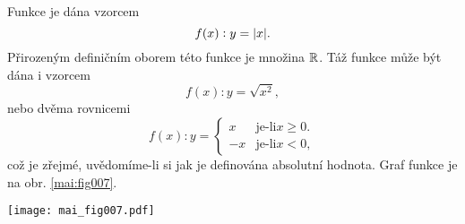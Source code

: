 \wikitextrule
\begin{example}\label{MAI:exam019} 
  Funkce je dána vzorcem 
  \begin{equation*}
    f(x):y=\lvert x\rvert.
  \end{equation*} 
  Přirozeným definičním oborem této funkce je množina $\mathbb{R}$. Táž funkce může být dána i 
  vzorcem
  \begin{equation*}
    f(x):y=\sqrt{x^2},
  \end{equation*}    
  nebo dvěma rovnicemi
  \begin{equation*}
    f(x):y=
       \begin{cases}
           x & \text{je-li} x \geq 0. \\
          -x & \text{je-li} x < 0,
       \end{cases}                 
  \end{equation*}  
  což je zřejmé, uvědomíme-li si jak je definována absolutní hodnota. Graf funkce je na obr. 
  \ref{mai:fig007}.
  
  {\centering
   \captionsetup{type=figure}
%  
   \texttt{[image: mai\_fig007.pdf]}
   \label{mai:fig007}
  \par}
\end{example}